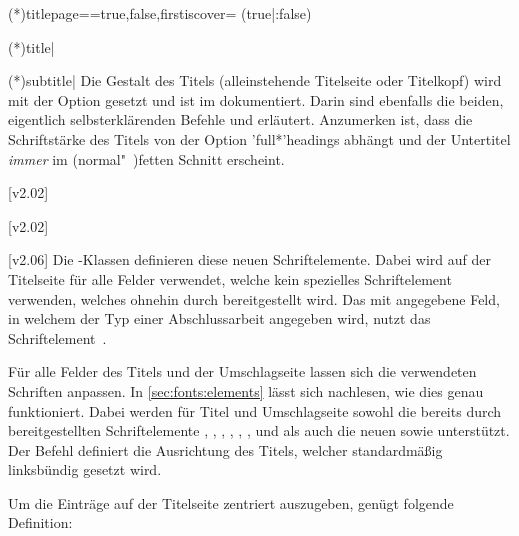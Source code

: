 \begin{DeclareEntity*}{}
\begin{DeclareEntity*}{}
\begin{DeclareEntity*}{}
\begin{Declaration}
  {\Option(*){titlepage=\PMisc}}=true,false,firstiscover=
  (true|:false)
\begin{Declaration}
  {\Macro(*){title|}}
\begin{Declaration}
  {\Macro(*){subtitle|}}
Die Gestalt des Titels (alleinstehende Titelseite oder Titelkopf) wird mit der 
Option  gesetzt und ist im \scrguide dokumentiert. Darin sind 
ebenfalls die beiden, eigentlich selbsterklärenden Befehle  und 
 erläutert. Anzumerken ist, dass die Schriftstärke des Titels 
von der Option \Option'full*'{headings} abhängt und der Untertitel \emph{immer} 
im (normal"~)fetten Schnitt erscheint. 

\end{Declaration}
\end{Declaration}
\end{Declaration}

\begin{Declaration}
  {}
  [v2.02]
\begin{Declaration}
  {}
  [v2.02]
\begin{Declaration}
  {}
  [v2.06]
%
Die \TUDScript-Klassen definieren diese neuen Schriftelemente. Dabei wird 
 auf der Titelseite für alle Felder verwendet, welche kein 
spezielles Schriftelement verwenden, welches ohnehin durch \KOMAScript 
bereitgestellt wird. Das mit  angegebene Feld, in welchem der Typ 
einer Abschlussarbeit angegeben wird, nutzt das Schriftelement~. 

%
Für alle Felder des Titels und der Umschlagseite lassen sich die verwendeten
Schriften anpassen. In \autoref{sec:fonts:elements} lässt sich nachlesen, wie 
dies genau funktioniert. Dabei werden für Titel und Umschlagseite sowohl die 
bereits durch \KOMAScript bereitgestellten Schriftelemente , 
, , , , , 
 und  als auch die neuen  
sowie  unterstützt.
%
Der Befehl  definiert die Ausrichtung des Titels, welcher 
standardmäßig linksbündig gesetzt wird.
%
\begin{Example}
Um die Einträge auf der Titelseite zentriert auszugeben, genügt folgende 
Definition:
\begin{Code}
\let\raggedtitle\centering
\end{Code}
\end{Example}
\end{Declaration}
\end{Declaration}
\end{Declaration}


\end{DeclareEntity*}
\end{DeclareEntity*}
\end{DeclareEntity*}
